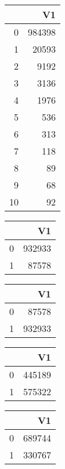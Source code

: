 \bigskip\bigskip
\centering
\begin{tabular}{rr}
  \hline
 & V1 \\ 
  \hline
0 & 984398 \\ 
  1 & 20593 \\ 
  2 & 9192 \\ 
  3 & 3136 \\ 
  4 & 1976 \\ 
  5 & 536 \\ 
  6 & 313 \\ 
  7 & 118 \\ 
  8 &  89 \\ 
  9 &  68 \\ 
  10 &  92 \\ 
   \hline
\end{tabular}

\bigskip\bigskip
\centering
\begin{tabular}{rr}
  \hline
 & V1 \\ 
  \hline
0 & 932933 \\ 
  1 & 87578 \\ 
   \hline
\end{tabular}

\bigskip\bigskip
\centering
\begin{tabular}{rr}
  \hline
 & V1 \\ 
  \hline
0 & 87578 \\ 
  1 & 932933 \\ 
   \hline
\end{tabular}

\bigskip\bigskip
\centering
\begin{tabular}{rr}
  \hline
 & V1 \\ 
  \hline
0 & 445189 \\ 
  1 & 575322 \\ 
   \hline
\end{tabular}

\bigskip\bigskip
\centering
\begin{tabular}{rr}
  \hline
 & V1 \\ 
  \hline
0 & 689744 \\ 
  1 & 330767 \\ 
   \hline
\end{tabular}

